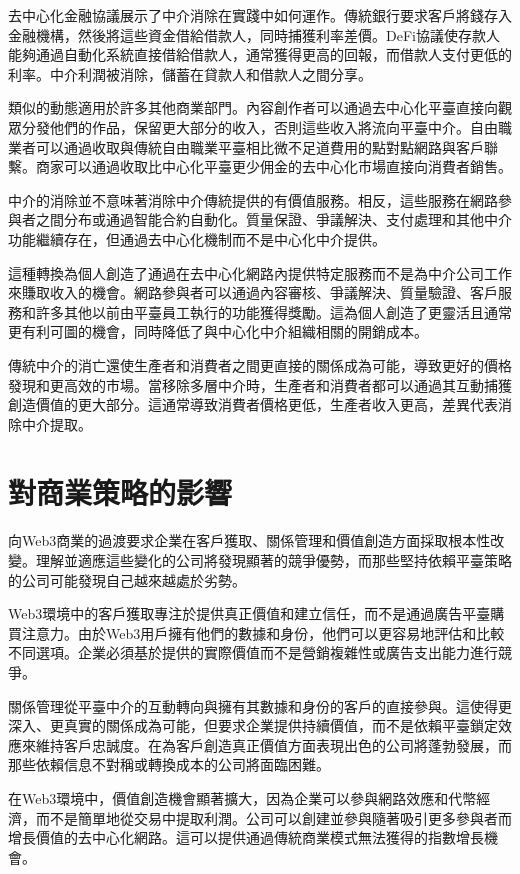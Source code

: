 \documentclass[
  Letterpaper,
]{scrbook}
\begin{document}
去中心化金融協議展示了中介消除在實踐中如何運作。傳統銀行要求客戶將錢存入金融機構，然後將這些資金借給借款人，同時捕獲利率差價。DeFi協議使存款人能夠通過自動化系統直接借給借款人，通常獲得更高的回報，而借款人支付更低的利率。中介利潤被消除，儲蓄在貸款人和借款人之間分享。

類似的動態適用於許多其他商業部門。內容創作者可以通過去中心化平臺直接向觀眾分發他們的作品，保留更大部分的收入，否則這些收入將流向平臺中介。自由職業者可以通過收取與傳統自由職業平臺相比微不足道費用的點對點網路與客戶聯繫。商家可以通過收取比中心化平臺更少佣金的去中心化市場直接向消費者銷售。

中介的消除並不意味著消除中介傳統提供的有價值服務。相反，這些服務在網路參與者之間分布或通過智能合約自動化。質量保證、爭議解決、支付處理和其他中介功能繼續存在，但通過去中心化機制而不是中心化中介提供。

這種轉換為個人創造了通過在去中心化網路內提供特定服務而不是為中介公司工作來賺取收入的機會。網路參與者可以通過內容審核、爭議解決、質量驗證、客戶服務和許多其他以前由平臺員工執行的功能獲得獎勵。這為個人創造了更靈活且通常更有利可圖的機會，同時降低了與中心化中介組織相關的開銷成本。

傳統中介的消亡還使生產者和消費者之間更直接的關係成為可能，導致更好的價格發現和更高效的市場。當移除多層中介時，生產者和消費者都可以通過其互動捕獲創造價值的更大部分。這通常導致消費者價格更低，生產者收入更高，差異代表消除中介提取。

\section{對商業策略的影響}\label{ux5c0dux5546ux696dux7b56ux7565ux7684ux5f71ux97ff}

向Web3商業的過渡要求企業在客戶獲取、關係管理和價值創造方面採取根本性改變。理解並適應這些變化的公司將發現顯著的競爭優勢，而那些堅持依賴平臺策略的公司可能發現自己越來越處於劣勢。

Web3環境中的客戶獲取專注於提供真正價值和建立信任，而不是通過廣告平臺購買注意力。由於Web3用戶擁有他們的數據和身份，他們可以更容易地評估和比較不同選項。企業必須基於提供的實際價值而不是營銷複雜性或廣告支出能力進行競爭。

關係管理從平臺中介的互動轉向與擁有其數據和身份的客戶的直接參與。這使得更深入、更真實的關係成為可能，但要求企業提供持續價值，而不是依賴平臺鎖定效應來維持客戶忠誠度。在為客戶創造真正價值方面表現出色的公司將蓬勃發展，而那些依賴信息不對稱或轉換成本的公司將面臨困難。

在Web3環境中，價值創造機會顯著擴大，因為企業可以參與網路效應和代幣經濟，而不是簡單地從交易中提取利潤。公司可以創建並參與隨著吸引更多參與者而增長價值的去中心化網路。這可以提供通過傳統商業模式無法獲得的指數增長機會。
\end{document}
